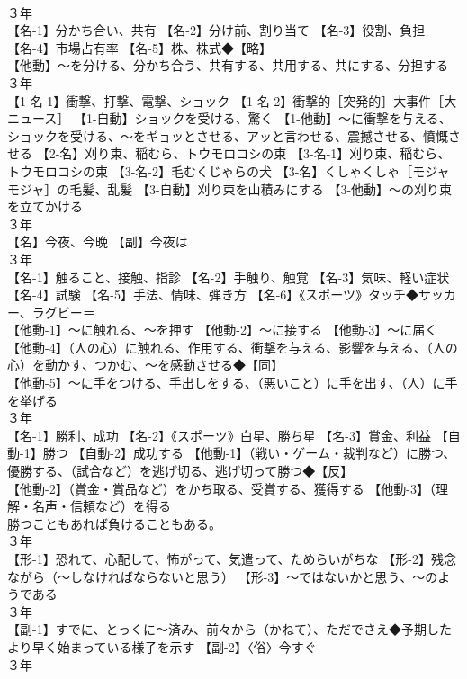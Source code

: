 \documentclass[8pt]{extreport}
\begin{document}
\begin{CJK}{UTF8}{min}
\\	３年	
\\	【名-1】分かち合い、共有 【名-2】分け前、割り当て 【名-3】役割、負担 【名-4】市場占有率 【名-5】株、株式◆【略】
\\	【他動】～を分ける、分かち合う、共有する、共用する、共にする、分担する
\\	３年	
\\	【1-名-1】衝撃、打撃、電撃、ショック 【1-名-2】衝撃的［突発的］大事件［大ニュース］ 【1-自動】ショックを受ける、驚く 【1-他動】～に衝撃を与える、ショックを受ける、～をギョッとさせる、アッと言わせる、震撼させる、憤慨させる 【2-名】刈り束、稲むら、トウモロコシの束 【3-名-1】刈り束、稲むら、トウモロコシの束 【3-名-2】毛むくじゃらの犬 【3-名】くしゃくしゃ［モジャモジャ］の毛髪、乱髪 【3-自動】刈り束を山積みにする 【3-他動】～の刈り束を立てかける
\\	３年	
\\	【名】今夜、今晩 【副】今夜は
\\	３年	
\\	【名-1】触ること、接触、指診 【名-2】手触り、触覚 【名-3】気味、軽い症状 【名-4】試験 【名-5】手法、情味、弾き方 【名-6】《スポーツ》タッチ◆サッカー、ラグビー＝
\\	【他動-1】～に触れる、～を押す 【他動-2】～に接する 【他動-3】～に届く 【他動-4】（人の心）に触れる、作用する、衝撃を与える、影響を与える、（人の心）を動かす、つかむ、～を感動させる◆【同】
\\	【他動-5】～に手をつける、手出しをする、（悪いこと）に手を出す、（人）に手を挙げる
\\	３年	
\\	【名-1】勝利、成功 【名-2】《スポーツ》白星、勝ち星 【名-3】賞金、利益 【自動-1】勝つ 【自動-2】成功する 【他動-1】（戦い・ゲーム・裁判など）に勝つ、優勝する、（試合など）を逃げ切る、逃げ切って勝つ◆【反】
\\	【他動-2】（賞金・賞品など）をかち取る、受賞する、獲得する 【他動-3】（理解・名声・信頼など）を得る
\\	勝つこともあれば負けることもある。
\\	３年	
\\	【形-1】恐れて、心配して、怖がって、気遣って、ためらいがちな 【形-2】残念ながら（～しなければならないと思う） 【形-3】～ではないかと思う、～のようである
\\	３年	
\\	【副-1】すでに、とっくに～済み、前々から（かねて）、ただでさえ◆予期したより早く始まっている様子を示す 【副-2】〈俗〉今すぐ
\\	３年	

\end{CJK}
\end{document}
